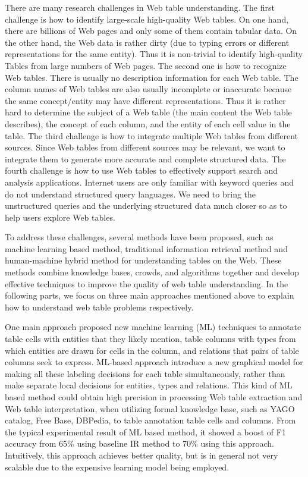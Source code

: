 \documentclass{article} %
\begin{document}
There are many research challenges in Web table understanding. The first challenge is how to identify large-scale high-quality Web tables. On one hand, there are billions of Web pages and only some of them contain tabular data. On the other hand, the Web data is rather dirty (due to typing errors or different representations for the same entity). Thus it is non-trivial to identify high-quality Tables from large numbers of Web pages. The second one is how to recognize Web tables. There is usually no description information for each Web table. The column names of Web tables are also usually incomplete or inaccurate because the same concept/entity may have different representations. Thus it is rather hard to determine the subject of a Web table (the main content the Web table describes), the concept of each column, and the entity of each cell value in the table. The third challenge is how to integrate multiple Web tables from different sources. Since Web tables from different sources may be relevant, we want to integrate them to generate more accurate and complete structured data. The fourth challenge is how to use Web tables to effectively support search and analysis applications. Internet users are only familiar with keyword queries and do not understand structured query languages. We need to bring the unstructured queries and the underlying structured data much closer so as to help users explore Web tables.

To address these challenges, several methods have been proposed, such as machine learning based method, traditional information retrieval method and human-machine hybrid method for understanding tables on the Web. These methods combine knowledge bases, crowds, and algorithms together and develop effective techniques to improve the quality of web table understanding. In the following parts, we focus on three main approaches mentioned above to explain how to understand web table problems respectively.

One main approach proposed new machine learning (ML) techniques to annotate table cells with entities that they likely mention, table columns with types from which entities are drawn for cells in the column, and relations that pairs of table columns seek to express. ML-based approach introduce a new graphical model for making all these labeling decisions for each table simultaneously, rather than make separate local decisions for entities, types and relations. This kind of ML based method could obtain high precision in processing Web table extraction and Web table interpretation, when utilizing formal knowledge base, such as YAGO catalog, Free Base, DBPedia, to table annotation table cells and columns. From the typical experimental result of ML based method, it showed a boost of F1 accuracy from 65\% using baseline IR method to 70\% using this approach. Intuitively, this approach achieves better quality, but is in general not very scalable due to the expensive learning model being employed.
\end{document}
